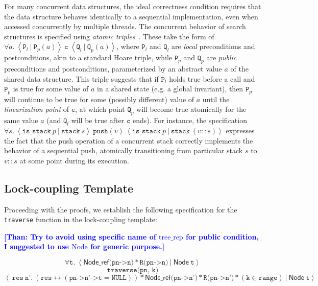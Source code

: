 \documentclass[a4paper,UKenglish,cleveref, autoref, thm-restate]{lipics-v2021}
\newcommand{\treerep}{\ensuremath{\mathsf{Node}}}
\newcommand{\nodeboxrep}{\ensuremath{\mathsf{Node\_ref}}}
\newcommand{\lockinv}{\ensuremath{\mathsf{lock\_inv}}}
\newcommand{\than}[1]{\textbf{\textcolor{blue}{[Than: #1]}}}
\begin{document}
For many concurrent data structures, the ideal correctness condition requires that the data structure behaves identically to a sequential implementation, even when accessed concurrently by multiple threads. The concurrent behavior of search structures is specified using \emph{atomic triples}~\cite{tada}. These take the form of $\forall a.\ \left\langle \texttt{P}_l\ |\ \texttt{P}_p(a) \right\rangle\ \texttt{c}\ \left\langle \texttt{Q}_l\ |\ \texttt{Q}_p(a)\right\rangle$, where $\texttt{P}_l$ and $\texttt{Q}_l$ are \emph{local} preconditions and postconditions, akin to a standard Hoare triple, while $\texttt{P}_p$ and $\texttt{Q}_p$ are \emph{public} preconditions and postconditions, parameterized by an abstract value $a$ of the shared data structure. This triple suggests that if $\texttt{P}_l$ holds true before a call and $\texttt{P}_p$ is true for some value of $a$ in a shared state (e.g. a global invariant), then $\texttt{P}_p$ will continue to be true for some (possibly different) value of $a$ until the \emph{linearization point} of $\texttt{c}$, at which point $\texttt{Q}_p$ will become true atomically for the same value $a$ (and $\texttt{Q}_l$ will be true after $\texttt{c}$ ends). For instance, the specification
$\forall s.\ \left\langle \texttt{is\_stack}\ p\ |\ \texttt{stack}\ s\right\rangle\ \texttt{push}(v)\ \left\langle \texttt{is\_stack}\ p\ |\ \texttt{stack}\ (v::s)\right\rangle$
expresses the fact that the push operation of a concurrent stack correctly implements the behavior of a sequential push, atomically transitioning from particular stack $s$ to $v::s$ at some point during its execution.

\subsection{Lock-coupling Template}
Proceeding with the proofs, we establish the following specification for the \lstinline{traverse} function in the lock-coupling template:

\than{Try to avoid using specific name of $\mathrm{tree\_rep}$ for public condition, I suggested to use $\mathrm{Node}$ for generic purpose.} 


$$\forall \texttt{t}.\ \left\langle \nodeboxrep \texttt{(pn->n)} 
\ast \texttt{R(pn->n)} \ | \ \treerep\ \texttt{t} \right\rangle $$
$$\texttt{traverse(pn, k)}$$
$$\left\langle \ \texttt{res} \ \texttt{n'}. \ (\texttt{res} \leftrightarrow (\texttt{pn->n'->t} = \texttt{NULL})) \ast \nodeboxrep \texttt{(pn->n')}
\ast \texttt{R(pn->n')} \ast (\texttt{k} \in \texttt{range})
\   |\ \treerep\ \texttt{t} \right\rangle$$
\end{document}
